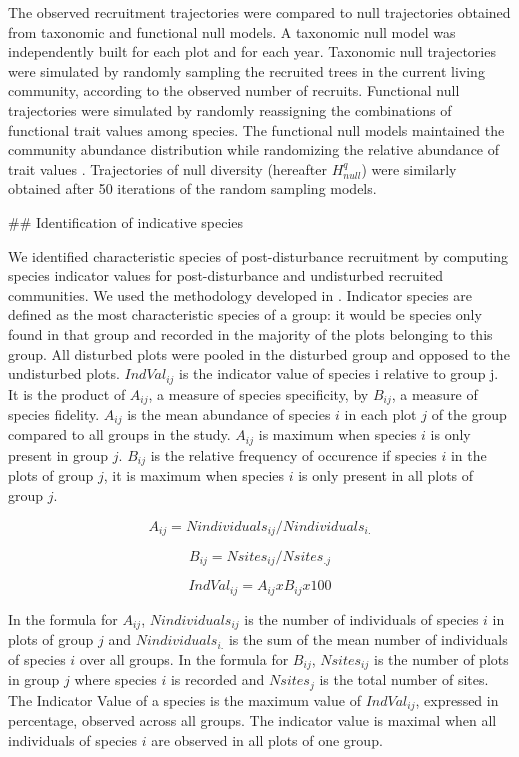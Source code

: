 \documentclass[fleqn,10pt]{ArtEcoFoG} %
\begin{document}
The observed recruitment trajectories were compared to null trajectories
obtained from taxonomic and functional null models. A taxonomic null
model was independently built for each plot and for each year. Taxonomic
null trajectories were simulated by randomly sampling the recruited
trees in the current living community, according to the observed number
of recruits. Functional null trajectories were simulated by randomly
reassigning the combinations of functional trait values among species.
The functional null models maintained the community abundance
distribution while randomizing the relative abundance of trait values
\citep{Mason2013}. Trajectories of null diversity (hereafter
\(H^q_{null}\)) were similarly obtained after 50 iterations of the
random sampling models.

\color{red} \#\# Identification of indicative species

We identified characteristic species of post-disturbance recruitment by
computing species indicator values for post-disturbance and undisturbed
recruited communities. We used the methodology developed in
\citet{Dufrene1997}. Indicator species are defined as the most
characteristic species of a group: it would be species only found in
that group and recorded in the majority of the plots belonging to this
group. All disturbed plots were pooled in the disturbed group and
opposed to the undisturbed plots. \(IndVal_{ij}\) is the indicator value
of species i relative to group j. It is the product of \(A_{ij}\), a
measure of species specificity, by \(B_{ij}\), a measure of species
fidelity. \(A_{ij}\) is the mean abundance of species \(i\) in each plot
\(j\) of the group compared to all groups in the study. \(A_{ij}\) is
maximum when species \(i\) is only present in group \(j\). \(B_{ij}\) is
the relative frequency of occurence if species \(i\) in the plots of
group \(j\), it is maximum when species \(i\) is only present in all
plots of group \(j\).

\begin{equation}
A_{ij} = Nindividuals_{ij} / Nindividuals_{i.}
\end{equation}

\begin{equation}
B_{ij} = Nsites_{ij} / Nsites_{.j}
\end{equation}

\begin{equation}
IndVal_{ij} = A_{ij} x B_{ij} x 100
\end{equation}

In the formula for \(A_{ij}\), \(Nindividuals_{ij}\) is the number of
individuals of species \(i\) in plots of group \(j\) and
\(Nindividuals_{i.}\) is the sum of the mean number of individuals of
species \(i\) over all groups. In the formula for \(B_{ij}\),
\(Nsites_{ij}\) is the number of plots in group \(j\) where species
\(i\) is recorded and \(Nsites_{j}\) is the total number of sites. The
Indicator Value of a species is the maximum value of \(IndVal_{ij}\),
expressed in percentage, observed across all groups. The indicator value
is maximal when all individuals of species \(i\) are observed in all
plots of one group.
\end{document}

